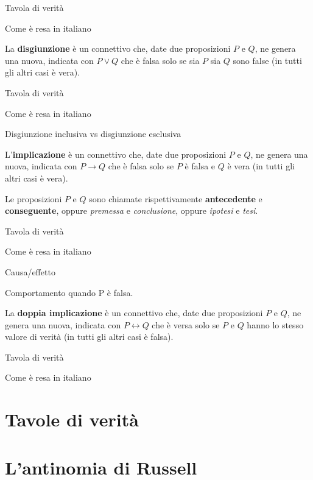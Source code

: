 Tavola di verità

Come è resa in italiano

\begin{definizione}[Disgiunzione]
    La \textbf{disgiunzione} è un connettivo che, date due proposizioni $P$ e $Q$, ne genera una nuova, indicata con
    $P \lor Q$ che è falsa solo se sia $P$ sia $Q$ sono false (in tutti gli altri casi è vera).
\end{definizione}

Tavola di verità

Come è resa in italiano

Disgiunzione inclusiva vs disgiunzione esclusiva

\begin{definizione}[Implicazione]
    L'\textbf{implicazione} è un connettivo che, date due proposizioni $P$ e $Q$, ne genera una nuova, indicata con
    $P \rightarrow Q$ che è falsa solo se $P$ è falsa e $Q$ è vera (in tutti gli altri casi è vera).

    Le proposizioni $P$ e $Q$ sono chiamate rispettivamente \textbf{antecedente} e \textbf{conseguente},
    oppure \emph{premessa} e \emph{conclusione}, oppure \emph{ipotesi} e \emph{tesi}.
\end{definizione}

Tavola di verità

Come è resa in italiano

Causa/effetto

Comportamento quando P è falsa.

\begin{definizione}
    La \textbf{doppia implicazione} è un connettivo che, date due proposizioni $P$ e $Q$, ne genera una nuova, indicata con
    $P \leftrightarrow Q$ che è versa solo se $P$ e $Q$ hanno lo stesso valore di verità (in tutti gli altri casi è falsa).
\end{definizione}

Tavola di verità

Come è resa in italiano

\section{Tavole di verità}
\label{sec:tavole_di_verita}

\section{L'antinomia di Russell}
\label{sec:antinomia_di_russell}